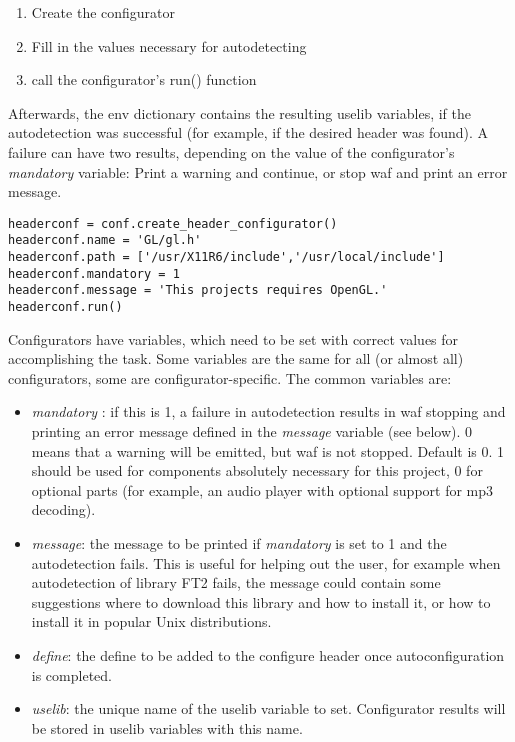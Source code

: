 \documentclass[a4,10pt]{article}
\begin{document}
\begin{enumerate}
	\item Create the configurator
	\item Fill in the values necessary for autodetecting
	\item call the configurator's run() function
\end{enumerate}
Afterwards, the env dictionary contains the resulting uselib variables, if the autodetection was successful
(for example, if the desired header was found). A failure can have two results,
depending on the value of the configurator's \emph{mandatory} variable: Print a warning and continue, or stop waf and print an error message.
\begin{center}
	\begin{lstlisting}[caption=\footnotesize Example header configurator usage]
headerconf = conf.create_header_configurator()
headerconf.name = 'GL/gl.h'
headerconf.path = ['/usr/X11R6/include','/usr/local/include']
headerconf.mandatory = 1
headerconf.message = 'This projects requires OpenGL.'
headerconf.run()
	\end{lstlisting}
\end{center}
Configurators have variables, which need to be set with correct values for accomplishing the task.
Some variables are the same for all (or almost all) configurators, some are configurator-specific. The common variables are:

\begin{itemize}
	\item \emph{mandatory} : if this is 1, a failure in autodetection results in waf stopping and printing an error message defined in the
	\emph{message} variable (see below). 0 means that a warning will be emitted, but waf is not stopped. Default is 0. 1 should be used for components absolutely necessary for this project, 0 for optional parts (for example, an audio player with optional support for mp3 decoding).
	\item \emph{message}: the message to be printed if \emph{mandatory} is set to 1 and the autodetection fails. This is useful for
	helping out the user, for example when autodetection of library FT2 fails, the message could contain some suggestions where to download this library and how to install it, or how to install it in popular Unix distributions.
	\item \emph{define}: the define to be added to the configure header once autoconfiguration is completed.
	\item \emph{uselib}: the unique name of the uselib variable to set. Configurator results will be stored in uselib variables with this name.
\end{itemize}
\end{document}
